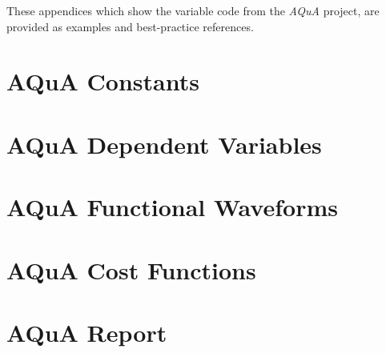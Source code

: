 \documentclass[pdftex,11pt,letterpaper]{article}
\begin{document}
\begin{appendices}

These appendices which show the variable code from the \textit{AQuA} project, are provided as examples and best-practice references.

\section{AQuA Constants} \label{AQuA Constants}


\section{AQuA Dependent Variables} \label{AQuA Dependent Variables}


\section{AQuA Functional Waveforms} \label{AQuA Functional Waveforms}


\section{AQuA Cost Functions} \label{AQuA Cost Functions}


\section{AQuA Report} \label{AQuA Report}


\end{appendices}
\end{document}

